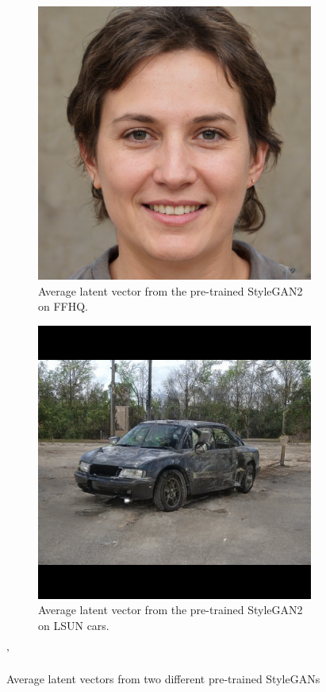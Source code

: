 \begin{figure}
  \begin{subfigure}[b]{0.45\textwidth}
      \centering
      \includegraphics[width=\textwidth]{images/magec/face_average.png}
      \caption{Average latent vector from the pre-trained StyleGAN2 on FFHQ.}
      \label{fig:avg_ffhq}
  \end{subfigure}
  \hfill
  \begin{subfigure}[b]{0.45\textwidth}
      \centering
      \includegraphics[width=\textwidth]{images/magec/car_average.png}
      \caption{Average latent vector from the pre-trained StyleGAN2 on LSUN cars.}
      \label{fig:avg_cars}
  \end{subfigure}
  \caption{Average latent vectors from two different pre-trained StyleGANs}
  \label{fig:stylegan_averages}'
\end{figure}
